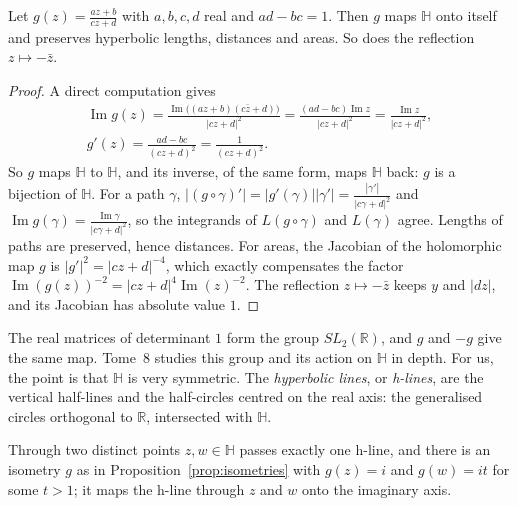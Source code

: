 \begin{proposition}[isometries]\label{prop:isometries}
Let $g(z)=\frac{az+b}{cz+d}$ with $a,b,c,d$ real and $ad-bc=1$. Then $g$ maps $\mathbb H$ onto itself and preserves hyperbolic lengths, distances and areas.
So does the reflection $z\mapsto-\bar z$.
\end{proposition}

\begin{proof}
A direct computation gives
\[
\begin{gathered}
\operatorname{Im}g(z)=\frac{\operatorname{Im}\bigl((az+b)(c\bar z+d)\bigr)}{|cz+d|^2}=\frac{(ad-bc)\operatorname{Im}z}{|cz+d|^2}=\frac{\operatorname{Im}z}{|cz+d|^2},\\
g'(z)=\frac{ad-bc}{(cz+d)^2}=\frac1{(cz+d)^2}.
\end{gathered}
\]
So $g$ maps $\mathbb H$ to $\mathbb H$, and its inverse, of the same form, maps $\mathbb H$ back: $g$ is a bijection of $\mathbb H$. For a path $\gamma$,
$|(g\circ\gamma)'|=|g'(\gamma)||\gamma'|=\frac{|\gamma'|}{|c\gamma+d|^2}$ and $\operatorname{Im}g(\gamma)=\frac{\operatorname{Im}\gamma}{|c\gamma+d|^2}$, so the
integrands of $L(g\circ\gamma)$ and $L(\gamma)$ agree. Lengths of paths are preserved, hence distances. For areas, the Jacobian of the holomorphic map $g$ is
$|g'|^2=|cz+d|^{-4}$, which exactly compensates the factor $\operatorname{Im}(g(z))^{-2}=|cz+d|^4\operatorname{Im}(z)^{-2}$. The reflection $z\mapsto-\bar z$
keeps $y$ and $|dz|$, and its Jacobian has absolute value $1$.
\end{proof}

The real matrices of determinant $1$ form the group $SL_2(\mathbb R)$, and $g$ and $-g$ give the same map. Tome~8 studies this group and its action on
$\mathbb H$ in depth. For us, the point is that $\mathbb H$ is very symmetric. The \emph{hyperbolic lines}, or \emph{h-lines}, are the vertical half-lines and
the half-circles centred on the real axis: the generalised circles orthogonal to $\mathbb R$, intersected with $\mathbb H$.

\begin{lemma}\label{lem:hlines}
Through two distinct points $z,w\in\mathbb H$ passes exactly one h-line, and there is an isometry $g$ as in Proposition~\ref{prop:isometries} with $g(z)=i$
and $g(w)=it$ for some $t>1$; it maps the h-line through $z$ and $w$ onto the imaginary axis.
\end{lemma}

